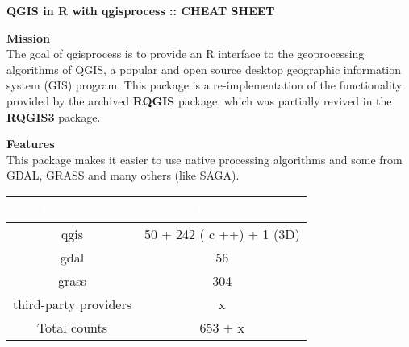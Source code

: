 \documentclass{article}
\begin{document}
\pagestyle{footerstyle}
\begin{flushleft}
  \begin{adjustbox}{width=850pt}
    \fontsize{40}{30}\selectfont\textbf{QGIS in R with qgisprocess :: CHEAT SHEET}
  \end{adjustbox}
\end{flushleft}


\begin{multicols*}{3}
\setlength{\columnsep}{400pt}

\begin{minipage}{\linewidth}
  \vspace{-5pt}
   \textbf{\fontsize{44}{44}\selectfont \textbf{Mission}}\vspace{8pt}\\ 
   The goal of qgisprocess is to provide an R interface to the geoprocessing algorithms of QGIS, a popular and open source desktop geographic information system (GIS) program. This package is a re-implementation of the functionality provided by the archived \textbf{RQGIS} package, which was partially revived in the \textbf{RQGIS3} package.
\end{minipage}

\begin{minipage}{\linewidth}
  \vspace{1pt}
   \textbf{\fontsize{20}{5}\selectfont \textbf{Features}}\vspace{8pt}\\ 
  This package makes it easier to use native processing algorithms and some from GDAL, GRASS and many others (like SAGA).

\begin{center}
\setlength{\arrayrulewidth}{0.001pt} 
\renewcommand{\arraystretch}{1.25} 
\begin{tabular}{|c|c|}
  \hline
  \rowcolor{mycolor} 
  \textcolor{white}{\textbf{Providers}} & \textcolor{white}{\textbf{Algorithms}} \\
  \hline
  qgis &  50 + 242 ( c ++) + 1 (3D) \\
  \hline
  gdal & 56 \\
  \hline
  grass & 304 \\
  \hline
  third-party providers & x \\
  \hline
  Total counts & 653 + x \\
  \hline
\end{tabular}
\end{center}  
\end{minipage}


\end{multicols*}
\end{document}
